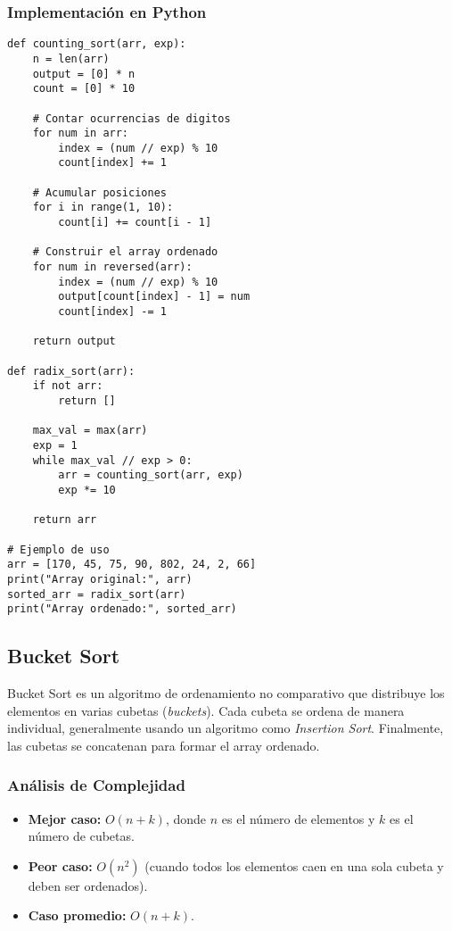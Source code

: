 \documentclass[11pt,openany]{book}
\begin{document}
\subsubsection{Implementación en Python}
\lstset{language=Python}
\begin{lstlisting}
def counting_sort(arr, exp):
    n = len(arr)
    output = [0] * n
    count = [0] * 10

    # Contar ocurrencias de digitos
    for num in arr:
        index = (num // exp) % 10
        count[index] += 1

    # Acumular posiciones
    for i in range(1, 10):
        count[i] += count[i - 1]

    # Construir el array ordenado
    for num in reversed(arr):
        index = (num // exp) % 10
        output[count[index] - 1] = num
        count[index] -= 1

    return output

def radix_sort(arr):
    if not arr:
        return []

    max_val = max(arr)
    exp = 1
    while max_val // exp > 0:
        arr = counting_sort(arr, exp)
        exp *= 10

    return arr

# Ejemplo de uso
arr = [170, 45, 75, 90, 802, 24, 2, 66]
print("Array original:", arr)
sorted_arr = radix_sort(arr)
print("Array ordenado:", sorted_arr)
\end{lstlisting}


\subsection{Bucket Sort}
Bucket Sort es un algoritmo de ordenamiento no comparativo que distribuye los elementos en varias cubetas (\textit{buckets}). Cada cubeta se ordena de manera individual, generalmente usando un algoritmo como \textit{Insertion Sort}. Finalmente, las cubetas se concatenan para formar el array ordenado.

\subsubsection{Análisis de Complejidad}
\begin{itemize}
    \item \textbf{Mejor caso:} $O(n + k)$, donde $n$ es el número de elementos y $k$ es el número de cubetas.
    \item \textbf{Peor caso:} $O(n^2)$ (cuando todos los elementos caen en una sola cubeta y deben ser ordenados).
    \item \textbf{Caso promedio:} $O(n + k)$.
\end{itemize}
\end{document}
